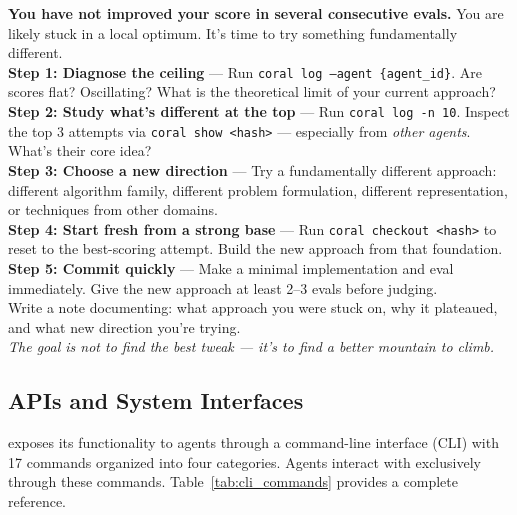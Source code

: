\begin{heartbeatbox}
\label{box:pivot}
\ttfamily\scriptsize
\textbf{You have not improved your score in several consecutive evals.} You are likely stuck in a local optimum. It's time to try something fundamentally different.\\[3pt]
\textbf{Step 1: Diagnose the ceiling} --- Run \texttt{coral log --agent \{agent\_id\}}. Are scores flat? Oscillating? What is the theoretical limit of your current approach?\\[2pt]
\textbf{Step 2: Study what's different at the top} --- Run \texttt{coral log -n 10}. Inspect the top 3 attempts via \texttt{coral show <hash>} --- especially from \textit{other agents}. What's their core idea?\\[2pt]
\textbf{Step 3: Choose a new direction} --- Try a fundamentally different approach: different algorithm family, different problem formulation, different representation, or techniques from other domains.\\[2pt]
\textbf{Step 4: Start fresh from a strong base} --- Run \texttt{coral checkout <hash>} to reset to the best-scoring attempt. Build the new approach from that foundation.\\[2pt]
\textbf{Step 5: Commit quickly} --- Make a minimal implementation and eval immediately. Give the new approach at least 2--3 evals before judging.\\[3pt]
Write a note documenting: what approach you were stuck on, why it plateaued, and what new direction you're trying.\\[2pt]
\textit{The goal is not to find the best tweak --- it's to find a better mountain to climb.}
\end{heartbeatbox}

\subsection{APIs and System Interfaces}
\label{app:apis}

\method{} exposes its functionality to agents through a command-line interface (CLI) with 17 commands organized into four categories. Agents interact with \method{} exclusively through these commands. Table~\ref{tab:cli_commands} provides a complete reference.


